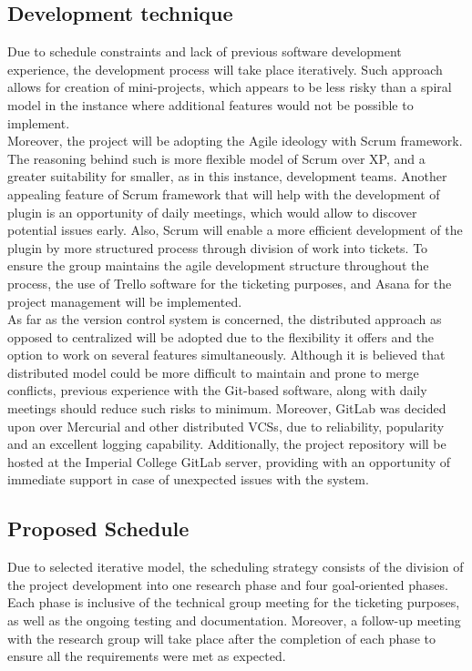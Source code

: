 \documentclass[a4paper,11pt]{article}
\begin{document}
\subsection{Development technique}
Due to schedule constraints and lack of previous software development experience, the development process will take place iteratively\cite{SoftwareEngineering}. Such approach allows for creation of mini-projects, which appears to be less risky than a spiral model in the instance where additional features would not be possible to implement. 
\\
\indent Moreover, the project will be adopting the Agile ideology\cite{Scrum} with Scrum framework. The reasoning behind such is more flexible model of Scrum over XP, and a greater suitability for smaller, as in this instance, development teams. Another appealing feature of Scrum framework that will help with the development of plugin is an opportunity of daily meetings, which would allow to discover potential issues early. Also, Scrum will enable a more efficient development of the plugin by more structured process through division of work into tickets. To ensure the group maintains the agile development structure throughout the process, the use of Trello\cite{trello} software for the ticketing purposes, and Asana\cite{asana} for the project management will be implemented.
\\
\indent As far as the version control system is concerned, the distributed approach as opposed to centralized will be adopted due to the flexibility it offers and the option to work on several features simultaneously\cite{Design}. Although it is believed that distributed model could be more difficult to maintain and prone to merge conflicts\cite{Design}, previous experience with the Git-based software, along with daily meetings should reduce such risks to minimum. Moreover, GitLab was decided upon over Mercurial and other distributed VCSs, due to reliability, popularity and an excellent logging capability\cite{GitLab}. Additionally, the project repository will be hosted at the Imperial College GitLab server, providing with an opportunity of immediate support in case of unexpected issues with the system. 

\subsection{Proposed Schedule}
Due to selected iterative model, the scheduling strategy consists of the division of the project development into one research phase and four goal-oriented phases\cite{twelve}. Each phase is inclusive of the technical group meeting for the ticketing purposes, as well as the ongoing testing and documentation. Moreover, a follow-up meeting with the research group will take place after the completion of each phase to ensure all the requirements were met as expected. 
\end{document}
